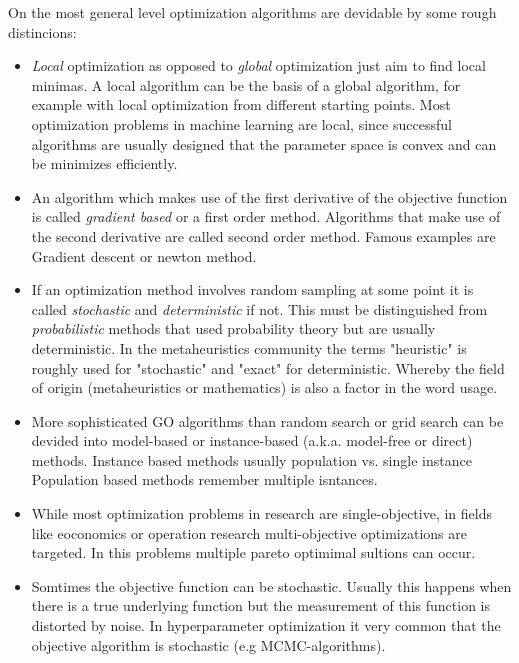 \documentclass[english]{article}
\begin{document}
On the most general level optimization algorithms are devidable by some rough distincions:

\begin{itemize}
  \item \textit{Local} optimization as opposed to \textit{global} optimization just aim to find local minimas. A local algorithm can be the basis of a global algorithm, for example with local optimization from different starting points. Most optimization problems in machine learning are local, since successful algorithms are usually designed that the parameter space is convex and can be minimizes efficiently.

  \item An algorithm which makes use of the first derivative of the objective function is called \textit{gradient based} or a first order method. Algorithms that make use of the second derivative are called second order method. Famous examples are Gradient descent or newton method.

  \item If an optimization method involves random sampling at some point it is called \textit{stochastic} and \textit{deterministic} if not. This must be distinguished from \textit{probabilistic} methods that used probability theory but are usually deterministic. In the metaheuristics community the terms "heuristic" is roughly used for "stochastic" and "exact" for deterministic. Whereby the field of origin (metaheuristics or mathematics) is also a factor in the  word usage.

  \item More sophisticated \ac{GO} algorithms than random search or grid search can be devided into model-based or instance-based (a.k.a. model-free or direct) methods. Instance based methods usually population vs. single instance Population based methods remember multiple isntances.

  \item While most optimization problems in research are single-objective, in fields like eoconomics or operation research multi-objective optimizations are targeted. In this problems multiple pareto optimimal sultions can occur.

  \item Somtimes the objective function can be stochastic. Usually this happens when there is a true underlying function but the measurement of this function is distorted by noise. In hyperparameter optimization it very common that the objective algorithm is stochastic (e.g MCMC-algorithms).

\end{itemize}
\end{document}
